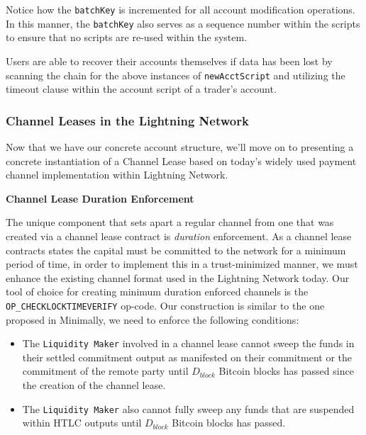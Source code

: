 \documentclass[10pt,a4paper]{article}
\theoremstyle{definition}
\begin{document}
Notice how the \texttt{batchKey} is incremented for all account modification
operations. In this manner, the \texttt{batchKey} also serves as a sequence
number within the scripts to ensure that no scripts are re-used within the
system.

Users are able to recover their accounts themselves if data has been lost by
scanning the chain for the above instances of \texttt{newAcctScript} and
utilizing the timeout clause within the account script of a trader's account.


\subsubsection{Channel Leases in the Lightning Network}

Now that we have our concrete account structure, we'll move on to presenting a
concrete instantiation of a Channel Lease based on today's widely used payment
channel implementation within Lightning Network. \\

\begin{center}
    \textbf{Channel Lease Duration Enforcement}
\end{center}

The unique component that sets apart a regular channel from one that was
created via a channel lease contract is \emph{duration} enforcement. As a
channel lease contracts states the capital must be committed to the network for
a minimum period of time, in order to implement this in a trust-minimized
manner, we must enhance the existing channel format \cite{bolt3} used in the
Lightning Network today. Our tool of choice for creating minimum duration
enforced channels is the \texttt{OP\_CHECKLOCKTIMEVERIFY} \cite{cltvBip}
op-code. Our construction is similar to the one proposed in \cite{zTowards}
Minimally, we need to enforce the following conditions:
\begin{itemize}
    \item The \texttt{Liquidity Maker} involved in a channel lease cannot sweep
        the funds in their settled commitment output as manifested on their
        commitment or the commitment of the remote party until $D_{block}$
        Bitcoin blocks has passed since the creation of the channel lease.
    \item The \texttt{Liquidity Maker} also cannot fully sweep any funds that
        are suspended within HTLC outputs until $D_{block}$ Bitcoin blocks has
        passed.
\end{itemize}
\end{document}
